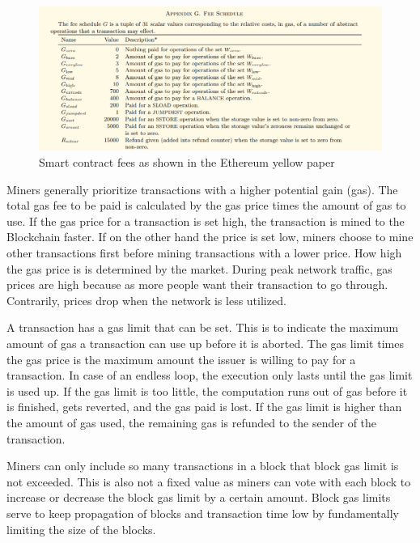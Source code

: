 \begin{figure}[ht!]
  \begin{center}
    \includegraphics[scale=0.6]{Talk7/img/smart_contracts/gas-fees}
  \end{center}
  \caption{Smart contract fees as shown in the Ethereum yellow paper}
  \label{fig:smart_contract_fees}
\end{figure}

Miners generally prioritize transactions with a higher potential gain (gas). The total gas fee to be paid is calculated by the gas price times the amount of gas to use. If the gas price for a transaction is set high, the transaction is mined to the Blockchain faster. If on the other hand the price is set low, miners choose to mine other transactions first before mining transactions with a lower price. How high the gas price is is determined by the market. During peak network traffic, gas prices are high because as more people want their transaction to go through. Contrarily, prices drop when the network is less utilized.

A transaction has a gas limit that can be set. This is to indicate the maximum amount of gas a transaction can use up before it is aborted. The gas limit times the gas price is the maximum amount the issuer is willing to pay for a transaction. In case of an endless loop, the execution only lasts until the gas limit is used up.
If the gas limit is too little, the computation runs out of gas before it is finished, gets reverted, and the gas paid is lost. If the gas limit is higher than the amount of gas used, the remaining gas is refunded to the sender of the transaction.

Miners can only include so many transactions in a block that block gas limit is not exceeded. This is also not a fixed value as miners can vote with each block to increase or decrease the block gas limit by a certain amount. Block gas limits serve to keep propagation of blocks and transaction time low by fundamentally limiting the size of the blocks.

